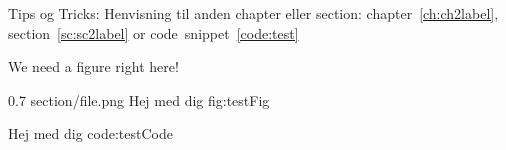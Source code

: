 Tips og Tricks:
Henvisning til anden chapter eller section:
chapter~\ref{ch:ch2label}, section~\ref{sc:sc2label} or code~snippet~\ref{code:test}

        

\missingfigure 
        {We need a figure right here!}

        {0.7                } %
        {section/file.png   } %
        {Hej med dig        } %
        {fig:testFig        } %
          
        {Hej med dig        } %
        {code:testCode      } %